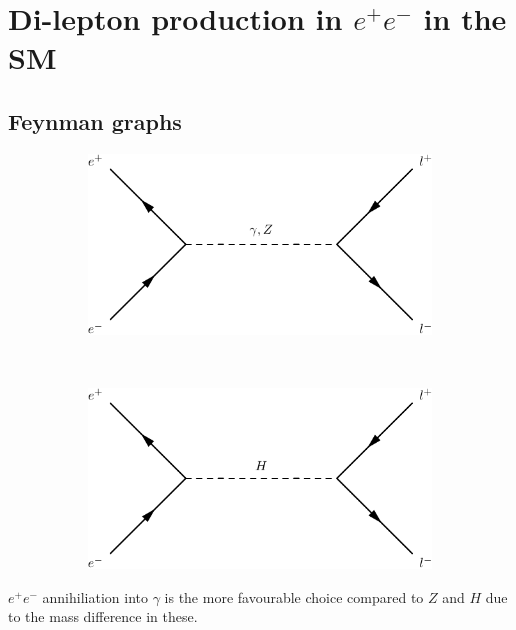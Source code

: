 \documentclass{article}
\begin{document}
\section{Di-lepton production in $e^+e^-$ in the SM}

\subsection{Feynman graphs}
\begin{figure}[h!]
  \centering
  \begin{subfigure}[b]{0.4\textwidth}
    \includegraphics[width=\textwidth]{../graphs/gammaZ.pdf}
  \end{subfigure}
~
  \begin{subfigure}[b]{0.4\textwidth}
    \includegraphics[width=\textwidth]{../graphs/H.pdf}
  \end{subfigure}
\end{figure}
$e^+e^-$ annihiliation into $\gamma$ is the more favourable choice
compared to $Z$ and $H$ due to the mass difference in these.
\end{document}
